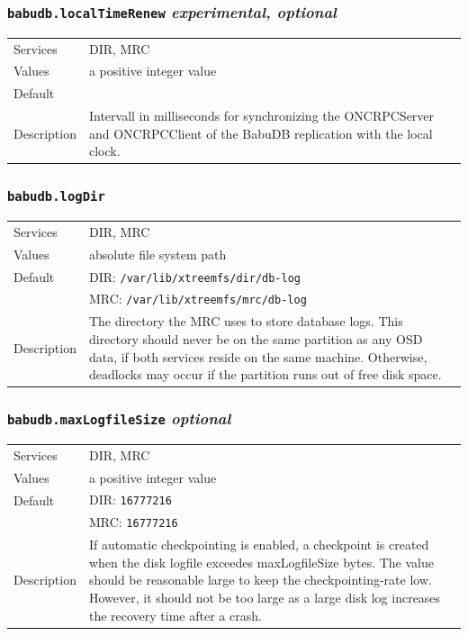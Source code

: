 \documentclass[a4paper,10pt]{book}
\begin{document}
\subsubsection{\texttt{babudb.localTimeRenew} \textit{experimental, optional}}
\begin{tabular}{lp{10cm}}
 Services & DIR, MRC\\
 Values   & a positive integer value\\
 Default  & \\
 Description & Intervall in milliseconds for synchronizing the ONCRPCServer and ONCRPCClient of the BabuDB replication with the local clock. 
\end{tabular}

\subsubsection{\texttt{babudb.logDir}}
\begin{tabular}{lp{10cm}}
 Services & DIR, MRC\\
 Values   & absolute file system path\\
 Default  & DIR: \texttt{/var/lib/xtreemfs/dir/db-log}\\
          & MRC: \texttt{/var/lib/xtreemfs/mrc/db-log}\\
 Description & The directory the MRC uses to store database logs. This directory should never be on the same partition as any OSD data, if both services reside on the same machine. Otherwise, deadlocks may occur if the partition runs out of free disk space.
\end{tabular}

\subsubsection{\texttt{babudb.maxLogfileSize} \textit{optional}}
\begin{tabular}{lp{10cm}}
 Services & DIR, MRC\\
 Values   & a positive integer value\\
 Default  & DIR: \texttt{16777216}\\
          & MRC: \texttt{16777216}\\
 Description & If automatic checkpointing is enabled, a checkpoint is created when the disk logfile exceedes maxLogfileSize bytes. The value should be reasonable large to keep the checkpointing-rate low. However, it should not be too large as a large disk log increases the recovery time after a crash.
\end{tabular}
\end{document}
